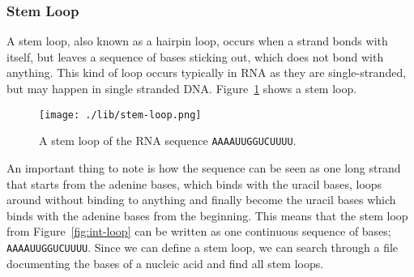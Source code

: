 \subsubsection{Stem Loop}
A stem loop, also known as a hairpin loop, occurs when a strand bonds with 
itself, but leaves a sequence of bases sticking out, which does not bond with anything. 
This kind of loop occurs typically in RNA as they are single-stranded, but may 
happen in single stranded DNA. Figure~\ref{fig:stem-loop} 
shows a stem loop.
\begin{figure}[h!]\centering
\texttt{[image: ./lib/stem-loop.png]}
\caption{A stem loop of the RNA sequence {\tt AAAAUUGGUCUUUU}.}
\label{fig:stem-loop}
\end{figure}
An important thing to note is how the sequence can be seen as one 
long strand that starts from the adenine bases, which binds with the uracil bases, 
loops around without binding to anything and finally become the uracil bases 
which binds with the adenine bases from the beginning. This means that the 
stem loop from Figure~\ref{fig:int-loop} can be written as one continuous 
sequence of bases; {\tt AAAAUUGGUCUUUU}. Since we can define a stem loop, we can 
search through a file documenting the bases of a nucleic acid and find all stem 
loops.
